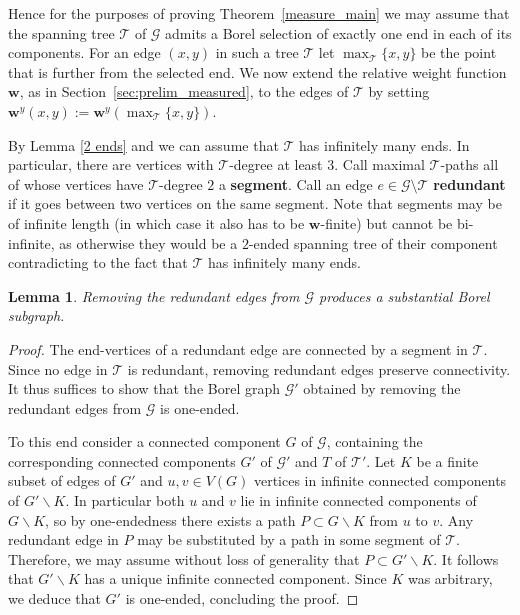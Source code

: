 \documentclass[letterpaper,11pt,reqno]{amsart}
\theoremstyle{bfnote}
\newtheorem{lemma}[theorem]{Lemma}
\theoremstyle{definition}
\newcommand{\0}{\varnothing}
\newcommand{\w}{\mathbf{w}}
\numberwithin{equation}{section}
\begin{document}
Hence for the purposes of proving Theorem~\ref{measure_main} we may assume that the spanning tree $\mathcal{T}$ of $\mathcal{G}$ admits a Borel selection of exactly one end in each of its components. For an edge $(x,y)$ in such a tree $\mathcal{T}$ let $\max_\mathcal{T}\{x,y\}$ be the point that is further from the selected end. We now extend the relative weight function $\w$, as in Section~\ref{sec:prelim_measured}, to the edges of $\mathcal{T}$ by setting $\w^y(x,y):=\w^y(\max_\mathcal{T}\{x,y\})$.

By Lemma \ref{2 ends} and \cite[Theorem E]{miller.2end} we can assume that $\mathcal{T}$ has infinitely many ends. In particular, there are vertices with $\mathcal{T}$-degree at least $3$.  Call maximal $\mathcal{T}$-paths all of whose vertices have $\mathcal{T} $-degree $2$ a \textbf{segment}.  Call an edge $e\in \mathcal{G}\setminus \mathcal{T}$ \textbf{redundant} if it goes between two vertices on the same segment.  Note that segments may be of infinite length (in which case it also has to be $\w$-finite) but cannot be bi-infinite, as otherwise they would be a $2$-ended spanning tree of their component contradicting to the fact that $\mathcal{T}$ has infinitely many ends.

\begin{lemma}
    Removing the redundant edges from $\mathcal{G}$ produces a substantial Borel subgraph.
\end{lemma}
\begin{proof}
    The end-vertices of a redundant edge are connected by a segment in $\mathcal{T}$. Since no edge in $\mathcal{T}$ is redundant, removing redundant edges preserve connectivity. It thus suffices to show that the Borel graph $\mathcal{G}'$ obtained by removing the redundant edges from $\mathcal{G}$ is one-ended. 
    
    To this end consider a connected component $G$ of $\mathcal{G}$, containing the corresponding connected components $G'$ of $\mathcal{G}'$ and $T$ of $\mathcal{T}'$. Let $K$ be a finite subset of edges of $G'$ and $u,v\in V(G)$ vertices in infinite connected components of $G' \backslash K$. In particular both $u$ and $v$ lie in infinite connected components of $G \backslash K$, so by one-endedness there exists a path $P \subset G \backslash K$ from $u$ to $v$. Any redundant edge in $P$ may be substituted by a path in some segment of $\mathcal{T}$. Therefore, we may assume without loss of generality that $P \subset G' \backslash K$. It follows that $G' \backslash K$ has a unique infinite connected component. Since $K$ was arbitrary, we deduce that $G'$ is one-ended, concluding the proof. 
    \end{proof}
\end{document}
